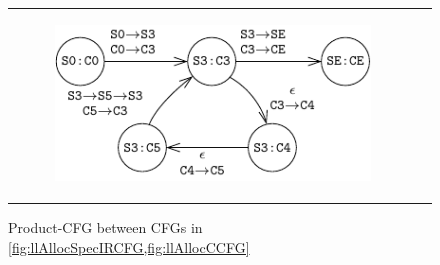 \begin{figure}[H]
\begin{tabular}{cc}
\begin{subfigure}[b]{1\textwidth}
\begin{center}
{\includegraphics[scale=1.2]{chapters/figures/figMallocProductCfg.pdf}}
\end{center}
\end{subfigure}%
\end{tabular}
\caption{\label{fig:llAllocProductCFG}Product-CFG between CFGs in \cref{fig:llAllocSpecIRCFG,fig:llAllocCCFG}}
\end{figure}
